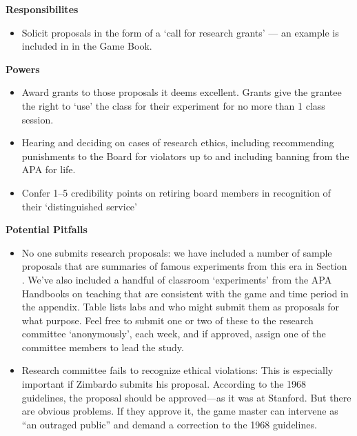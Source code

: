 \begin{refsection}
\textbf{Responsibilites}

\begin{itemize}
\item Solicit proposals in the form of a `call for research grants' --- an example is included in  in the Game Book.

\end{itemize}

\textbf{Powers} 

\begin{itemize}
\item Award grants to those proposals it deems excellent. Grants give the grantee the right to `use' the class for their experiment for no more than 1 class session.

\item Hearing and deciding on cases of research ethics, including recommending punishments to the Board for violators up to and including banning from the APA for life.

\item Confer 1--5 credibility points on retiring board members in recognition of their ‘distinguished service’

\end{itemize}

\textbf{Potential Pitfalls}

\begin{itemize}
\item No one submits research proposals: we have included a number of sample proposals that are summaries of famous experiments from this era in Section . We’ve also included a handful of classroom ‘experiments’ from the APA Handbooks on teaching that are consistent with the game and time period in the appendix. Table  lists labs and who might submit them as proposals for what purpose. Feel free to submit one or two of these to the research committee ‘anonymously’, each week, and if approved, assign one of the committee members to lead the study.

\item Research committee fails to recognize ethical violations: This is especially important if Zimbardo submits his proposal. According to the 1968 guidelines, the proposal should be approved---as it was at Stanford. But there are obvious problems. If they approve it, the game master can intervene as “an outraged public” and demand a correction to the 1968 guidelines.


\end{itemize}
\end{refsection}
